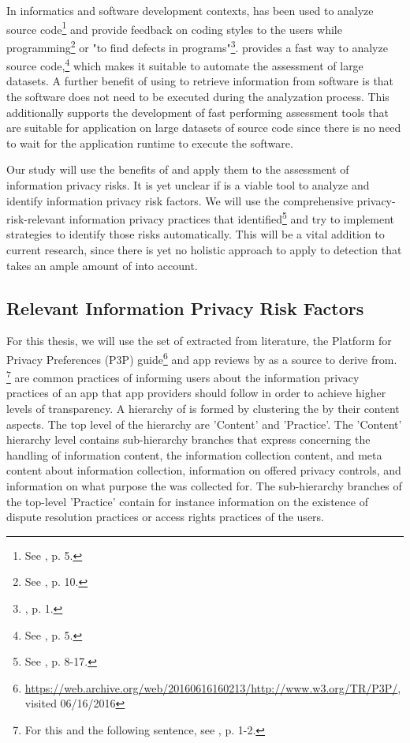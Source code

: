 In informatics and software development contexts, \sca has been used to analyze source code\footnote{See \cite{Haris2014}, p.  5.} and provide feedback on coding styles to the users while programming\footnote{See \cite{Bardas2010}, p. 10.} or "to find defects in programs"\footnote{\cite{Bardas2010}, p. 1.}.
\Sca provides a fast way to analyze source code,\footnote{See \cite{Bardas2010}, p. 5.} which makes it suitable to automate the assessment of large datasets.
A further benefit of using \sca to retrieve information from software is that the software does not need to be executed during the analyzation process.
This additionally supports the development of fast performing assessment tools that are suitable for application on large datasets of source code since there is no need to wait for the application runtime to execute the software.

Our study will use the benefits of \sca and apply them to the assessment of \mH information privacy risks.
It is yet unclear if \sca is a viable tool to analyze and identify information privacy risk factors.
We will use the comprehensive privacy-risk-relevant information privacy practices that \cite{Dehling2016} identified\footnote{See \cite{Dehling2016}, p. 8-17.} and try to implement \sca strategies to identify those risks automatically.
This will be a vital addition to current research, since there is yet no holistic approach to apply \sca to \ipr detection that takes an ample amount of \iprfs into account.


\subsection{Relevant Information Privacy Risk Factors}\label{chapter:Relevant}


For this thesis, we will use the set of \ipp extracted from literature, the Platform for Privacy Preferences (\acs{P3P}) guide\footnote{\url{https://web.archive.org/web/20160616160213/http://www.w3.org/TR/P3P/}, visited 06/16/2016} and app reviews by \cite{Dehling2016} as a source to derive \iprfs from. \footnote{For this and the following sentence, see \cite{Dehling2016}, p. 1-2.} 
\Ipp are common practices of informing users about the information privacy practices of an app that app providers should follow in order to achieve higher levels of transparency.
A hierarchy of \ipp is formed by clustering the \ipp by their content aspects. 
The top level of the hierarchy are 'Content' and 'Practice'.
The 'Content' hierarchy level contains sub-hierarchy branches that express \ipp concerning the handling of information content, the information collection content, and meta content about information collection, information on offered privacy controls, and information on what purpose the \ipp was collected for.
The sub-hierarchy branches of the top-level 'Practice' contain for instance information on the existence of dispute resolution practices or access rights practices of the users.

